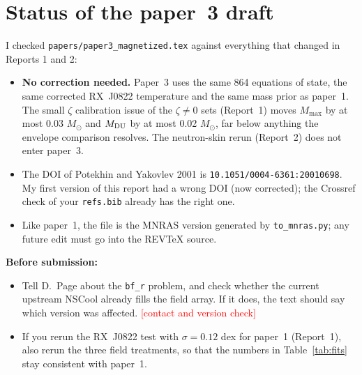 \documentclass[11pt,a4paper]{article}
\newcommand{\fillin}[1]{\textcolor{red}{[#1]}}
\newcommand{\Msun}{M_\odot}
\begin{document}
\section{Status of the paper~3 draft}
I checked \texttt{papers/paper3\_magnetized.tex} against everything that changed in Reports 1 and 2:
\begin{itemize}
\item \textbf{No correction needed.} Paper~3 uses the same 864 equations of state, the same corrected RX~J0822 temperature and the same mass prior as paper~1. The small $\zeta$ calibration issue of the $\zeta\neq0$ sets (Report~1) moves $M_{\max}$ by at most 0.03 $\Msun$ and $M_{\rm DU}$ by at most 0.02 $\Msun$, far below anything the envelope comparison resolves. The neutron-skin rerun (Report~2) does not enter paper~3.
\item The DOI of Potekhin and Yakovlev 2001 is \texttt{10.1051/0004-6361:20010698}. My first version of this report had a wrong DOI (now corrected); the Crossref check of your \texttt{refs.bib} already has the right one.
\item Like paper~1, the file is the MNRAS version generated by \texttt{to\_mnras.py}; any future edit must go into the REVTeX source.
\end{itemize}
\noindent\textbf{Before submission:}
\begin{itemize}
\item Tell D.~Page about the \texttt{bf\_r} problem, and check whether the current upstream NSCool already fills the field array. If it does, the text should say which version was affected. \fillin{contact and version check}
\item If you rerun the RX~J0822 test with $\sigma=0.12$ dex for paper~1 (Report~1), also rerun the three field treatments, so that the numbers in Table~\ref{tab:fits} stay consistent with paper~1.
\end{itemize}
\end{document}
